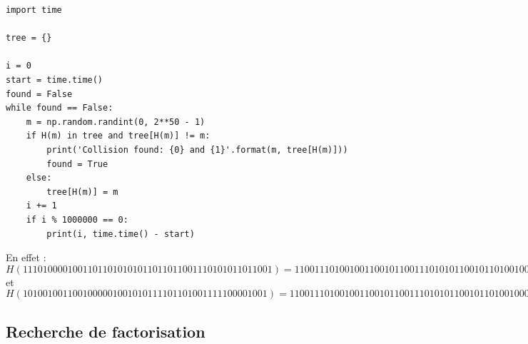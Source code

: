 \documentclass{article}
\begin{document}
\begin{lstlisting}
import time

tree = {}

i = 0
start = time.time()
found = False
while found == False:
    m = np.random.randint(0, 2**50 - 1)
    if H(m) in tree and tree[H(m)] != m:
        print('Collision found: {0} and {1}'.format(m, tree[H(m)]))
        found = True
    else:
        tree[H(m)] = m
    i += 1
    if i % 1000000 == 0:
        print(i, time.time() - start)
\end{lstlisting}

En effet : \\
$$H(11101000010011011010101011011011001110101011011001) = 110011101001001100101100111010101100101101001000$$ et 
$$H(1010010011001000001001010111101101001111100001001) = 110011101001001100101100111010101100101101001000.$$

\subsection{Recherche de factorisation}


\end{document}
